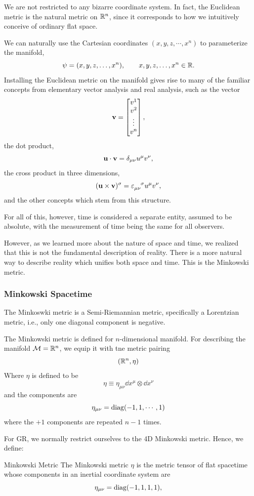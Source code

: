 		We are not restricted to any bizarre coordinate system. In fact,
		the Euclidean metric is the natural metric on $\mathbb{R}^n$, since it
		corresponds to how we intuitively conceive of ordinary flat space.

		We can naturally use the Cartesian coordinates
		$(x,y,z,\cdots,x^n)$ to parameterize the manifold,
		\[
			\psi
			=
			(x,y,z,\ldots,x^n),
			\qquad
			x,y,z,\ldots,x^n\in\mathbb{R}.
		\]
		Installing the Euclidean metric on the manifold gives rise to many
		of the familiar concepts from elementary vector analysis and real
		analysis, such as the vector
		\[
			\vb{v}
			=
			\bmqty{
				v^1\\
				v^2\\
				\vdots\\
				v^n
			},
		\]
		the dot product,
		\[
			\vb{u}\cdot\vb{v}
			=
			\delta_{\mu\nu}u^\mu v^\nu,
		\]
		the cross product in three dimensions,
		\[
			(\vb{u}\times\vb{v})^\sigma
			=
			\varepsilon\indices{_{\mu\nu}^\sigma}
			u^\mu v^\nu,
		\]
		and the other concepts which stem from this structure.

		For all of this, however, time is considered a separate entity,
		assumed to be absolute, with the measurement of time being the same
		for all observers.

		However, as we learned more about the nature of space and time,
		we realized that this is not the fundamental description of reality.
		There is a more natural way to describe reality which unifies both
		space and time. This is the Minkowski metric.

	\subsubsection{Minkowski Spacetime}

		The Minkoswki metric is a Semi-Riemannian metric, specifically a 
		Lorentzian metric, i.e., only one diagonal component is negative.

		The Minkowski metric is defined for $n$-dimensional manifold.
		For describing the manifold $\mathcal M= \mathbb{R}^n$, we equip it with tne 
		metric pairing
		\[
			(\mathbb{R}^n,\eta)
		\]
		Where $\eta$ is defined to be
		\[
			\eta \equiv \eta_{\mu\nu}\dd{x^\mu}\otimes \dd{x^\nu}
		\]
		and the components are
		\[
			\eta_{\mu\nu} = \operatorname{diag}(-1,1,\cdots,1)
		\]
		where the $+1$ components are repeated $n-1$ times.

		For GR, we normally restrict ourselves to the 4D Minkowski metric.
		Hence, we define:
		\begin{definition}{Minkowski Metric}
			The Minkowski metric $\eta$ is the metric tensor of flat spacetime
			whose components in an inertial coordinate system are
			\[
				\eta_{\mu\nu}
				=
				\operatorname{diag}(-1,1,1,1),
			\]
		\end{definition}
		
